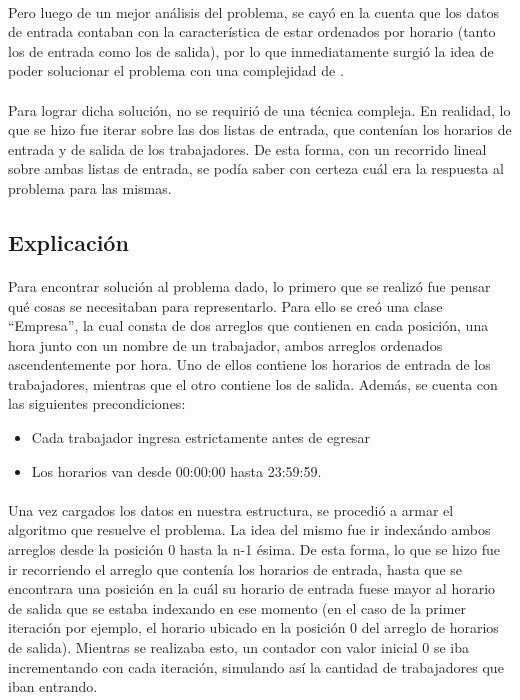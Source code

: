 \paragraph{}
Pero luego de un mejor an\'alisis del problema, se cay\'o en la cuenta que los datos de entrada contaban con la caracter\'istica de estar ordenados por horario (tanto los de entrada como los de salida), por lo que inmediatamente surgi\'o la idea de poder solucionar el problema con una complejidad de .

\paragraph{}
Para lograr dicha soluci\'on, no se requiri\'o de una t\'ecnica compleja. En realidad, lo que se hizo fue iterar sobre las dos listas de entrada, que conten\'ian los horarios de entrada y de salida de los trabajadores. De esta forma, con un recorrido lineal sobre ambas listas de entrada, se pod\'ia saber con certeza cu\'al era la respuesta al problema para las mismas.


\subsection{Explicación}
\label{explicacion}

\paragraph{}
Para encontrar soluci\'on al problema dado, lo primero que se realiz\'o fue pensar qu\'e cosas se necesitaban para representarlo. Para ello se cre\'o una clase ``Empresa'', la cual consta de dos arreglos que contienen en cada posici\'on, una hora junto con un nombre de un trabajador, ambos arreglos ordenados ascendentemente por hora. Uno de ellos contiene los horarios de entrada de los trabajadores, mientras que el otro contiene los de salida. Adem\'as, se cuenta con las siguientes precondiciones:
\begin{itemize}
 \item Cada trabajador ingresa estrictamente antes de egresar
 \item Los horarios van desde 00:00:00 hasta 23:59:59.
\end{itemize}
 

\paragraph{}
Una vez cargados los datos en nuestra estructura, se procedi\'o a armar el algoritmo que resuelve el problema. La idea del mismo fue ir index\'ando ambos arreglos desde la posici\'on 0 hasta la n-1 \'esima. De esta forma, lo que se hizo fue ir recorriendo el arreglo que conten\'ia los horarios de entrada, hasta que se encontrara una posici\'on en la cu\'al su horario de entrada fuese mayor al horario de salida que se estaba indexando en ese momento (en el caso de la primer iteraci\'on por ejemplo, el horario ubicado en la posici\'on 0 del arreglo de horarios de salida). Mientras se realizaba esto, un contador con valor inicial 0 se iba incrementando con cada iteraci\'on, simulando as\'i la cantidad de trabajadores que iban entrando.

